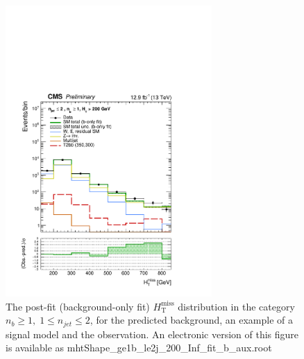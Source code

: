 \begin{figure}[tbhp]
    \caption{ 
    The post-fit (background-only fit) $H_{\mathrm{T}}^{\mathrm{miss}}$ distribution in the category $n_{b}\geq 1, \; 1 \leq n_{jet} \leq 2$, 
    for the predicted background, an example of a signal model and the observation.
    An electronic version of this figure is available as mhtShape\_ge1b\_le2j\_200\_Inf\_fit\_b\_aux.root
    \label{fig:mhtShape_ge1b_le2j_fit_b} }
  \begin{center}
  \includegraphics[width=0.7\textwidth]{mhtShape_ge1b_le2j_200_Inf_fit_b_aux}
  \end{center}
\end{figure}


